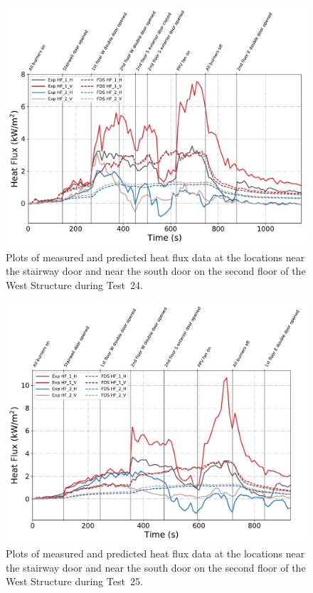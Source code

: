 \begin{figure}[!h]
	\centering
	\includegraphics[width=\columnwidth]{Figures/Plots/Validation/Heat_Flux/Test_24_HFs}
	\caption[Plots of measured and predicted heat flux data during Test~24.]{Plots of measured and predicted heat flux data at the locations near the stairway door and near the south door on the second floor of the West Structure during Test~24.}
	\label{fig:Test24_HFs}
\end{figure}

\begin{figure}[!h]
	\centering
	\includegraphics[width=\columnwidth]{Figures/Plots/Validation/Heat_Flux/Test_25_HFs}
	\caption[Plots of measured and predicted heat flux data during Test~25.]{Plots of measured and predicted heat flux data at the locations near the stairway door and near the south door on the second floor of the West Structure during Test~25.}
	\label{fig:Test25_HFs}
\end{figure}
